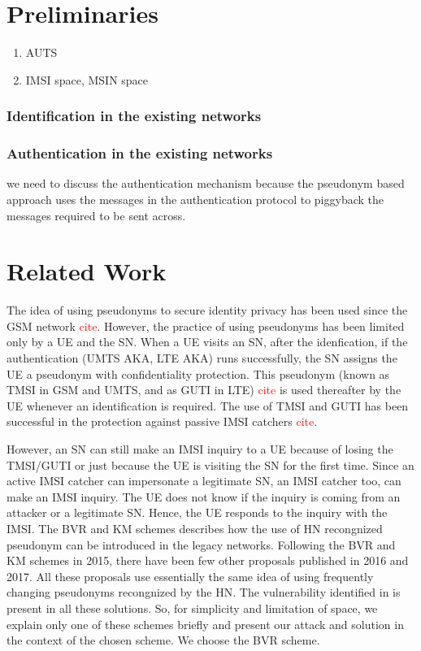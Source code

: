 \documentclass{llncs} %
\begin{document}
\section{Preliminaries}

\begin{enumerate}
 \item AUTS
 \item IMSI space, MSIN space
\end{enumerate}


\subsubsection{Identification in the existing networks}
\subsubsection{Authentication in the existing networks} we need to discuss the authentication mechanism because the pseudonym based approach uses the messages in the authentication protocol to piggyback the messages required to be sent across.

\section{Related Work}
The idea of using pseudonyms to secure identity privacy has been used since the GSM network \textcolor{red}{cite}. However, the practice of using pseudonyms has been limited only by a UE and the SN. When a UE visits an SN, after the idenfication, if the authentication (UMTS AKA, LTE AKA) runs successfully, the SN assigns the UE a pseudonym with confidentiality protection. This pseudonym (known as TMSI in GSM and UMTS, and as GUTI in LTE) \textcolor{red}{cite} is used thereafter by the UE whenever an identification is required. The use of TMSI and GUTI has been successful in the protection against passive IMSI catchers \textcolor{red}{cite}.

However, an SN can still make an IMSI inquiry to a UE because of losing the TMSI/GUTI or just because the UE is visiting the SN for the first time.  Since an active IMSI catcher can impersonate a legitimate SN, an IMSI catcher too, can make an IMSI inquiry. The UE does not know if the inquiry is coming from an attacker or a legitimate SN. Hence, the UE responds to the inquiry with the IMSI. The BVR and KM schemes describes how the use of HN recongnized pseudonym can be introduced in the legacy networks. Following the BVR and KM schemes in 2015, there have been few other proposals \cite{Ginzboorg_Niemi_2016,Norrman_Naslund_Dubrova_2016,yemen2017} published in 2016 and 2017. All these proposals use essentially the same idea of using frequently changing pseudonyms recongnized by the HN. The vulnerability identified in \cite{wisec17} is present in all these solutions. So, for simplicity and limitation of space, we explain only one of these schemes briefly and present our attack and solution in the context of the chosen scheme. We choose the BVR scheme.
\end{document}
